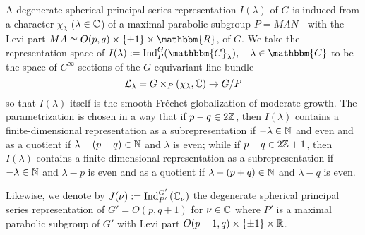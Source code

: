 \documentclass[reqno,12pt]{pja00} %
\newcommand{\assign}{:=}
\newcommand{\tmop}[1]{\ensuremath{\operatorname{#1}}}
\newcommand{\Ind}{\mbox{\normalfont Ind}}
\theoremstyle{definition}
\theoremstyle{exampstyle} \newtheorem{examp}[theorem]{Theorem}
\begin{document}
A degenerate spherical principal series representation $I(\lambda)$ of $G$ is induced from
a character $\chi_{\lambda}$ ($\lambda\in\mathbb{C}$) of a maximal parabolic subgroup $P=MAN_+$
with the Levi part
$M A \simeq O (p, q) \times \{ \pm 1 \} \times \mathbbm{R}$, of $G$.
We take the representation space of $I(\lambda)\assign \tmop{Ind}_P^G (\mathbbm{C}_{\lambda}), \quad \lambda
  \in \mathbbm{C}$ to be the space of $C^\infty$ sections
of the $G$-equivariant line bundle\[
	\mathcal{L}_\lambda=G\times_{P}\left( \chi_\lambda,\mathbb{C} \right)\to G/P
\]
so that $I(\lambda)$ itself is the smooth Fr\'echet globalization of moderate growth.
The parametrization is chosen in a way that if $p-q\in2\mathbb{Z}$, then 
$I(\lambda)$ contains a finite-dimensional representation as a subrepresentation if $-\lambda\in\mathbb{N}$ and even and as a quotient if $\lambda-\left( p+q\right)\in\mathbb{N}$ and $\lambda$ is even;
while if $p-q\in2\mathbb{Z}+1$, then 
$I(\lambda)$ contains a finite-dimensional representation as a subrepresentation if $-\lambda\in\mathbb{N}$ and $\lambda-p$ is even and as a quotient if $\lambda-\left( p+q\right)\in\mathbb{N}$ and $\lambda-q$ is even.

Likewise, we denote by $J(\nu):=\Ind_{P'}^{G'}\left( \C_\nu \right)$ the degenerate spherical principal series representation of $G'=O(p,q+1)$ for $\nu\in\mathbb{C}$ where $P'$ is a maximal parabolic
subgroup of $G'$ with Levi part $O(p-1,q)\times\left\{ \pm1 \right\}\times\mathbb{R}$.
\end{document}
